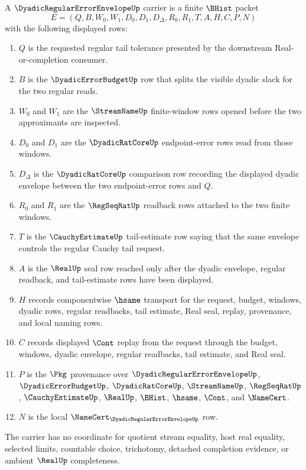 \begin{definition}
\label{def:dyadic-regular-error-envelope-carrier}
A $\DyadicRegularErrorEnvelopeUp$ carrier is a finite $\BHist$ packet
$$
E=(Q,B,W_0,W_1,D_0,D_1,D_\Delta,R_0,R_1,T,A,H,C,P,N)
$$
with the following displayed rows:
\begin{enumerate}
\item $Q$ is the requested regular tail tolerance presented by the downstream Real-or-completion consumer.
\item $B$ is the $\DyadicErrorBudgetUp$ row that splits the visible dyadic slack for the two regular reads.
\item $W_0$ and $W_1$ are the $\StreamNameUp$ finite-window rows opened before the two approximants are inspected.
\item $D_0$ and $D_1$ are the $\DyadicRatCoreUp$ endpoint-error rows read from those windows.
\item $D_\Delta$ is the $\DyadicRatCoreUp$ comparison row recording the displayed dyadic envelope between the two endpoint-error rows and $Q$.
\item $R_0$ and $R_1$ are the $\RegSeqRatUp$ readback rows attached to the two finite windows.
\item $T$ is the $\CauchyEstimateUp$ tail-estimate row saying that the same envelope controls the regular Cauchy tail request.
\item $A$ is the $\RealUp$ seal row reached only after the dyadic envelope, regular readback, and tail-estimate rows have been displayed.
\item $H$ records componentwise $\hsame$ transport for the request, budget, windows, dyadic rows, regular readbacks, tail estimate, Real seal, replay, provenance, and local naming rows.
\item $C$ records displayed $\Cont$ replay from the request through the budget, windows, dyadic envelope, regular readbacks, tail estimate, and Real seal.
\item $P$ is the $\Pkg$ provenance over $\DyadicRegularErrorEnvelopeUp$, $\DyadicErrorBudgetUp$, $\DyadicRatCoreUp$, $\StreamNameUp$, $\RegSeqRatUp$, $\CauchyEstimateUp$, $\RealUp$, $\BHist$, $\hsame$, $\Cont$, and $\NameCert$.
\item $N$ is the local $\NameCert_{\DyadicRegularErrorEnvelopeUp}$ row.
\end{enumerate}
The carrier has no coordinate for quotient stream equality, host real equality, selected limits, countable choice, trichotomy, detached completion evidence, or ambient $\RealUp$ completeness.
\end{definition}

